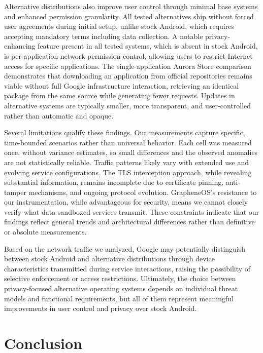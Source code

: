 Alternative distributions also improve user control through minimal base systems and enhanced permission granularity. All tested alternatives ship without forced user agreements during initial setup, unlike stock Android, which requires accepting mandatory terms including data collection. A notable privacy-enhancing feature present in all tested systems, which is absent in stock Android, is per-application network permission control, allowing users to restrict Internet access for specific applications. The single-application Aurora Store comparison demonstrates that downloading an application from official repositories remains viable without full Google infrastructure interaction, retrieving an identical package from the same source while generating fewer requests. Updates in alternative systems are typically smaller, more transparent, and user-controlled rather than automatic and opaque.

Several limitations qualify these findings. Our measurements capture specific, time-bounded scenarios rather than universal behavior. Each cell was measured once, without variance estimates, so small differences and the observed anomalies are not statistically reliable. Traffic patterns likely vary with extended use and evolving service configurations. The TLS interception approach, while revealing substantial information, remains incomplete due to certificate pinning, anti-tamper mechanisms, and ongoing protocol evolution. GrapheneOS's resistance to our instrumentation, while advantageous for security, means we cannot closely verify what data sandboxed services transmit. These constraints indicate that our findings reflect general trends and architectural differences rather than definitive or absolute measurements.

Based on the network traffic we analyzed, Google may potentially distinguish between stock Android and alternative distributions through device characteristics transmitted during service interactions, raising the possibility of selective enforcement or access restrictions. Ultimately, the choice between privacy-focused alternative operating systems depends on individual threat models and functional requirements, but all of them represent meaningful improvements in user control and privacy over stock Android.

\section{Conclusion}

